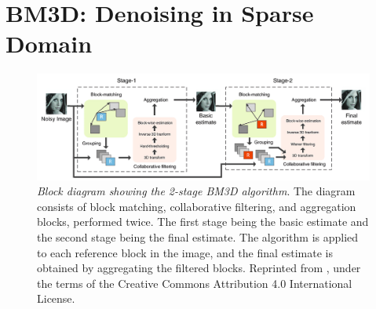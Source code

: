 



\section{BM3D: Denoising in Sparse Domain}\label{sec:bm3d}

\begin{figure}
    \centering
    \includegraphics[width=1\linewidth]{images/bm3d_schematic.png}
    \caption{\textit{Block diagram showing the 2-stage \gls{BM3D} algorithm}. The diagram consists of block matching, collaborative filtering, and aggregation blocks, performed twice. The first stage being the basic estimate and the second stage being the final estimate. The algorithm is applied to each reference block in the image, and the final estimate is obtained by aggregating the filtered blocks. Reprinted from \cite{wangFPGABasedHardwareAccelerator2020}, under the terms of the Creative Commons Attribution 4.0 International License.}
    \label{fig:bm3d-schematic}
\end{figure}


